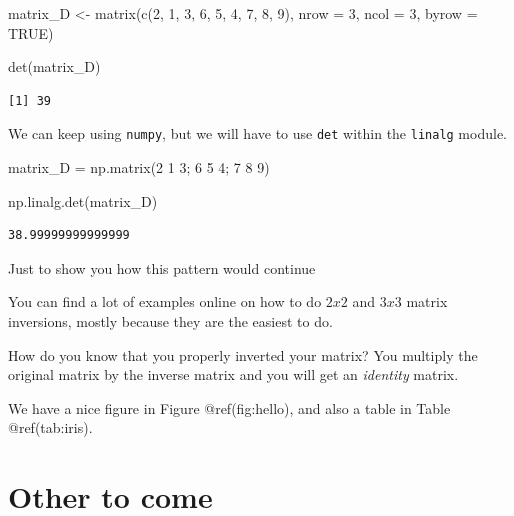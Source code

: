 \documentclass[
  letterpaper,
]{krantz}
\newenvironment{Shaded}{}{}
\newcommand{\AttributeTok}[1]{\textcolor[rgb]{0.49,0.56,0.16}{#1}}
\newcommand{\ConstantTok}[1]{\textcolor[rgb]{0.53,0.00,0.00}{#1}}
\newcommand{\DecValTok}[1]{\textcolor[rgb]{0.25,0.63,0.44}{#1}}
\newcommand{\FunctionTok}[1]{\textcolor[rgb]{0.02,0.16,0.49}{#1}}
\newcommand{\NormalTok}[1]{#1}
\newcommand{\OperatorTok}[1]{\textcolor[rgb]{0.40,0.40,0.40}{#1}}
\newcommand{\OtherTok}[1]{\textcolor[rgb]{0.00,0.44,0.13}{#1}}
\newcommand{\StringTok}[1]{\textcolor[rgb]{0.25,0.44,0.63}{#1}}
\begin{document}
\begin{Shaded}
\begin{Highlighting}[]
\NormalTok{matrix\_D }\OtherTok{\textless{}{-}} \FunctionTok{matrix}\NormalTok{(}\FunctionTok{c}\NormalTok{(}\DecValTok{2}\NormalTok{, }\DecValTok{1}\NormalTok{, }\DecValTok{3}\NormalTok{,}
                     \DecValTok{6}\NormalTok{, }\DecValTok{5}\NormalTok{, }\DecValTok{4}\NormalTok{,}
                     \DecValTok{7}\NormalTok{, }\DecValTok{8}\NormalTok{, }\DecValTok{9}\NormalTok{), }
                   \AttributeTok{nrow =} \DecValTok{3}\NormalTok{, }
                   \AttributeTok{ncol =} \DecValTok{3}\NormalTok{, }
                   \AttributeTok{byrow =} \ConstantTok{TRUE}\NormalTok{)}

\FunctionTok{det}\NormalTok{(matrix\_D)}
\end{Highlighting}
\end{Shaded}

\begin{verbatim}
[1] 39
\end{verbatim}

We can keep using \texttt{numpy}, but we will have to use \texttt{det}
within the \texttt{linalg} module.

\begin{Shaded}
\begin{Highlighting}[]
\NormalTok{matrix\_D }\OperatorTok{=}\NormalTok{ np.matrix(}\StringTok{\textquotesingle{}2 1 3; 6 5 4; 7 8 9\textquotesingle{}}\NormalTok{)}

\NormalTok{np.linalg.det(matrix\_D)}
\end{Highlighting}
\end{Shaded}

\begin{verbatim}
38.99999999999999
\end{verbatim}

Just to show you how this pattern would continue

You can find a lot of examples online on how to do \(2x2\) and \(3x3\)
matrix inversions, mostly because they are the easiest to do.

How do you know that you properly inverted your matrix? You multiply the
original matrix by the inverse matrix and you will get an
\emph{identity} matrix.

We have a nice figure in Figure @ref(fig:hello), and also a table in
Table @ref(tab:iris).

\chapter{Other to come}\label{other-to-come}
\end{document}
